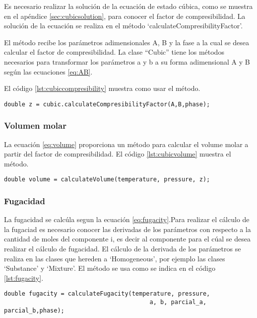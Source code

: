 	Es necesario realizar la solución de la ecuación de estado cúbica, como se muestra en el apéndice \ref{sec:cubicsolution}, para conocer el factor de compresibilidad. La solución de la ecuación se realiza en el método `calculateCompresibilityFactor'.

	El método recibe los parámetros adimensionales A, B y la fase a la cual se desea calcular el factor de compresibilidad. La clase ``Cubic'' tiene los métodos necesarios para transformar los parámetros a y b a su forma adimensional A y B según las ecuaciones \ref{eq:AB}.

	El código \ref{lst:cubiccompresibility} muestra como usar el método.
\begin{lstlisting}[label={lst:cubiccompresibility},caption={Cálculo del factor de compresibilidad con una ecuación de estado cúbica, proporcionando como argumento los parámetros adimensionales $A$,$B$, y la fase a la cual se desea calcular el factor}]
	double z = cubic.calculateCompresibilityFactor(A,B,phase);
\end{lstlisting}
	\subsubsection{Volumen molar}

	La ecuación \ref{eq:volume} proporciona un método para calcular el volume molar a partir del factor de compresibilidad. El código \ref{lst:cubicvolume} muestra el método.
\begin{lstlisting}[label={lst:cubicvolume},caption={Cálculo del volumen molar usando una ecuación de estado cúbica, el método recibe los parámetros de temperatura, presión y factor acéntrico}]
	double volume = calculateVolume(temperature, pressure, z);
\end{lstlisting}	
	\subsubsection{Fugacidad}
	La fugacidad se calcúla segun la ecuación \ref{eq:fugacity}.Para realizar el cálculo de la fugaciad es necesario conocer las derivadas de los parámetros con respecto a la cantidad de moles del componente i, es decir al componente para el cúal se desea realizar el cálculo de fugacidad. El cálculo de la derivada de los parámetros se realiza en las clases que hereden a `Homogeneous', por ejemplo las clases `Substance' y `Mixture'.
	El método se usa como se indica en el código \ref{lst:fugacity}.
\begin{lstlisting}[label={lst:fugacity},caption={Cálculo de fugacidad usando una ecuación de estad cúbica, el método recibe los parámetros de temperatura, presión ,los parámetros de la ecuación cúbica $a$ y $b$, las derivadas con respecto a la cantidad de moles $partial\_a$, $partial\_b$ y finalmente la fase a la que se desea el cálculo de la fugacidad.}]
	double fugacity = calculateFugacity(temperature, pressure,
										 a, b, parcial_a, parcial_b,phase);
\end{lstlisting}



